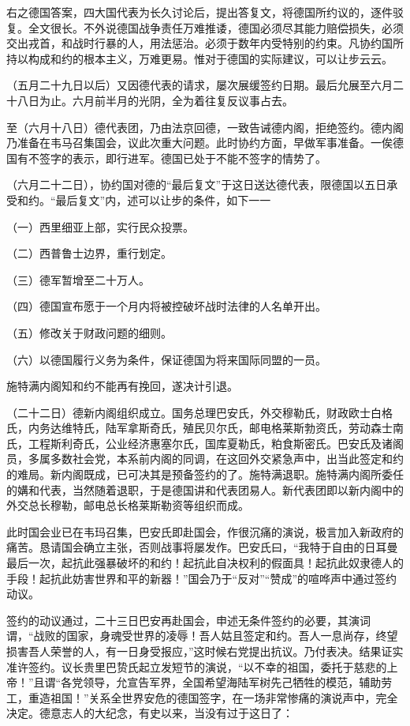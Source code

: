右之德国答案，四大国代表为长久讨论后，提出答复文，将德国所约议的，逐件驳复。全文很长。不外说德国战争责任万难推诿，德国必须尽其能力赔偿损失，必须交出戎首，和战时行暴的人，用法惩治。必须于数年内受特别的约束。凡协约国所持以构成和约的根本主义，万难更易。惟对于德国的实际建议，可以让步云云。

（五月二十九日以后）又因德代表的请求，屡次展缓签约日期。最后允展至六月二十八日为止。六月前半月的光阴，全为着往复反议事占去。

至（六月十八日）德代表团，乃由法京回德，一致告诫德内阁，拒绝签约。德内阁乃准备在韦马召集国会，议此次重大问题。此时协约方面，早做军事准备。一俟德国有不签字的表示，即行进军。德国已处于不能不签字的情势了。

（六月二十二日），协约国对德的“最后复文”于这日送达德代表，限德国以五日承受和约。“最后复文”内，述可以让步的条件，如下一一

（一）西里细亚上部，实行民众投票。

（二）西普鲁士边界，重行划定。

（三）德军暂增至二十万人。

（四）德国宣布愿于一个月内将被控破坏战时法律的人名单开出。

（五）修改关于财政问题的细则。

（六）以德国履行义务为条件，保证德国为将来国际同盟的一员。

施特满内阁知和约不能再有挽回，遂决计引退。

（二十二日）德新内阁组织成立。国务总理巴安氏，外交穆勒氏，财政欧士白格氏，内务达维特氏，陆军拿斯奇氏，殖民贝尔氏，邮电格莱斯勃资氏，劳动森士南氏，工程斯利奇氏，公业经济惠塞尔氏，国库夏勒氏，粕食斯密氏。巴安氏及诸阁员，多属多数社会党，本系前内阁的同调，在这回外交紧急声中，出当此签定和约的难局。新内阁既成，已可决其是预备签约的了。施特满退职。施特满内阁所委任的媾和代表，当然随着退职，于是德国讲和代表团易人。新代表团即以新内阁中的外交总长穆勒，邮电总长格莱斯勒资等组织而成。

此时国会业已在韦玛召集，巴安氏即赴国会，作很沉痛的演说，极言加入新政府的痛苦。恳请国会确立主张，否则战事将屡发作。巴安氏曰，“我特于自由的日耳曼最后一次，起抗此强暴破坏的和约！起抗此自决权利的假面具！起抗此奴隶德人的手段！起抗此妨害世界和平的新器！”国会乃于“反对”“赞成”的喧哗声中通过签约动议。

签约的动议通过，二十三日巴安再赴国会，申述无条件签约的必要，其演词谓，“战败的国家，身魂受世界的凌辱！吾人姑且签定和约。吾人一息尚存，终望损害吾人荣誉的人，有一日身受报应，”这时候右党提出抗议。乃付表决。结果证实准许签约。议长贵里巴贽氏起立发短节的演说，“以不幸的祖国，委托于慈悲的上帝！”且谓“各党领导，允宣告军界，全国希望海陆军树先己牺牲的模范，辅助劳工，重造祖国！”关系全世界安危的德国签字，在一场非常惨痛的演说声中，完全决定。德意志人的大纪念，有史以来，当没有过于这日了：

